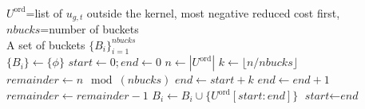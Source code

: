 \begin{algorithm}[htb]
\small%
\caption{\texttt{buildbuckets()}}
\label{alg:buildbuckets}
\begin{algorithmic}
\Require \\
$U^{\text{ord}}$=list of $u_{g,t}$ outside the kernel, most negative reduced cost first, \\
$\textit{nbucks}$=number of buckets
\Ensure \\A set of buckets $\{ B_i\}_{i=1}^{\textit{nbucks}}$\\
\State $\{ B_i\}   \leftarrow \lbrace\phi\rbrace$
\State $\textit{start}      \leftarrow 0 ; \textit{end}  \leftarrow 0$
\State $n                \leftarrow |U^{\text{ord}}|$
\State $k                \leftarrow \lfloor n / \textit{nbucks}\rfloor$
\State $\textit{remainder} \leftarrow n \mod{(\textit{nbucks})}$ 
        \State $\textit{end} \leftarrow \textit{start} + k$
            \State $ \textit{end}       \leftarrow \textit{end} + 1$
            \State $ \textit{remainder} \leftarrow \textit{remainder} - 1$
        \EndIf            
        \State $ B_i\leftarrow  B_i\cup \lbrace U^{\text{ord}}[\textit{start}:\textit{end}]\rbrace$
        \State $\textit{start} \leftarrow  \textit{end} $
\EndFor\\
\end{algorithmic}
\end{algorithm}   